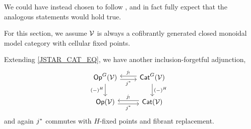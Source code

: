 \documentclass[a4paper,10pt
,draft
]{article}%
\renewcommand{\F}{\mathcal F}
\renewcommand{\1}{\eta}%
\begin{document}
\begin{remark}
      We could have instead chosen to follow \cite{Mur15}, and in fact
      fully expect that the analogous statements would hold true.
\end{remark}

\begin{convention}
      For this section, we assume $\mathcal V$ is always a cofibrantly generated closed monoidal model category with cellular fixed points.
\end{convention}





\begin{remark}
      \label{JSTAR_REM}        
      Extending \eqref{JSTAR_CAT_EQ}, we have another inclusion-forgetful adjunction,      
      \begin{equation}
            \begin{tikzcd}
                  \mathsf{Op}^G(\V) \arrow[d, "(-)^H"']
                  \arrow[r, shift right, "j^*"']
                  &
                  \mathsf{Cat}^G(\V) \arrow[l, shift right, swap, "j_!"] \arrow[d, "(-)^H"]
                  \\
                  \Op(\V) \arrow[r, shift right, "j^*"']
                  &
                  \Cat(\V) \arrow[l, shift right, swap, "j_!"]
            \end{tikzcd}
      \end{equation}
      and again $j^{\**}$ commutes with $H$-fixed points and fibrant replacement.
\end{remark}
\end{document}
